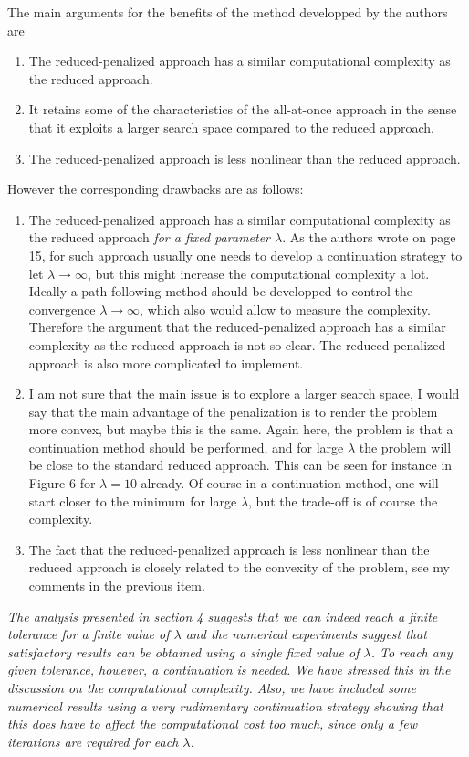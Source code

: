 \documentclass[12pt]{article}
\begin{document}
The main arguments for the benefits of the method developped by the authors are 
\begin{enumerate} 
\item The reduced-penalized approach has a similar computational complexity as the reduced approach. 
\item It retains some of the characteristics of the all-at-once approach in the sense that it exploits a larger search space compared to the reduced approach. 
\item The reduced-penalized approach is less nonlinear than the reduced approach. 
\end{enumerate} 
% 
However the corresponding drawbacks are as follows: 
\begin{enumerate} 
\item The reduced-penalized approach has a similar computational complexity as the reduced approach {\it for a fixed parameter $\lambda$}. As the authors wrote on page 15, for such approach usually one needs to develop a continuation strategy to let $\lambda\to\infty$, but this might increase the computational complexity a lot. Ideally a path-following method should be developped to control the convergence $\lambda\to\infty$, which also would allow to measure the complexity. Therefore the argument that the reduced-penalized approach has a similar complexity as the reduced approach is not so clear. The reduced-penalized approach is also more complicated to implement. 
\item I am not sure that the main issue is to explore a larger search space, I would say that the main advantage of the penalization is to render the problem more convex, but maybe this is the same. Again here, the problem is that a continuation method should be performed, and for large $\lambda$ the problem will be close to the standard reduced approach. This can be seen for instance in Figure 6 for $\lambda=10$ already. Of course in a continuation method, one will start closer to the minimum for large $\lambda$, but the trade-off is of course the complexity. 
\item The fact that the reduced-penalized approach is less nonlinear than the reduced approach is closely related to the convexity of the problem, see my comments in the previous item. 
\end{enumerate} 

\vspace{5mm}

\emph{The analysis presented in section 4 suggests that we can indeed reach a finite tolerance for a finite value of $\lambda$ and the numerical experiments suggest that satisfactory results can be obtained using a single fixed value of $\lambda$. To reach any given tolerance, however, a continuation is needed. We have stressed this in the discussion on the computational complexity. Also, we have included some numerical results using a very rudimentary continuation strategy showing that this does have to affect the computational cost too much, since only a few iterations are required for each $\lambda$.}
\end{document}
